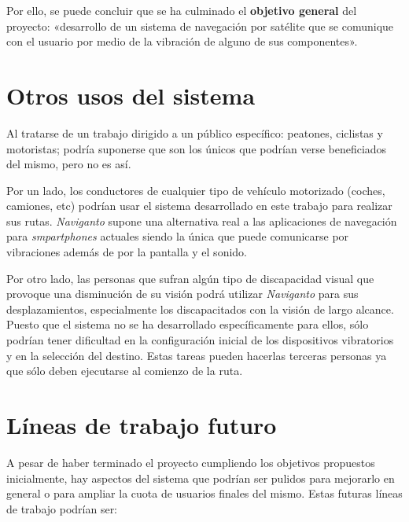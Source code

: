 Por ello, se puede concluir que se ha culminado el \textbf{objetivo general} del proyecto:
«desarrollo de un sistema de navegación por satélite que se comunique con el usuario por medio de la
  vibración de alguno de sus componentes».

\section{Otros usos del sistema}

Al tratarse de un trabajo dirigido a un público específico: peatones, ciclistas y motoristas; podría
suponerse que son los únicos que podrían verse beneficiados del mismo, pero no es así.

Por un lado, los conductores de cualquier tipo de vehículo motorizado (coches, camiones, etc)
podrían usar el sistema desarrollado en este trabajo para realizar sus rutas. \emph{Naviganto}
supone una alternativa real a las aplicaciones de navegación para \emph{smpartphones} actuales
siendo la única que puede comunicarse por vibraciones además de por la pantalla y el sonido.

Por otro lado, las personas que sufran algún tipo de discapacidad visual que provoque una
disminución de su visión podrá utilizar \emph{Naviganto} para sus desplazamientos, especialmente los
discapacitados con la visión de largo alcance. Puesto que el sistema no se ha desarrollado
específicamente para ellos, sólo podrían tener dificultad en la configuración inicial de los
dispositivos vibratorios y en la selección del destino. Estas tareas pueden hacerlas terceras
personas ya que sólo deben ejecutarse al comienzo de la ruta.

\section{Líneas de trabajo futuro}

A pesar de haber terminado el proyecto cumpliendo los objetivos propuestos inicialmente, hay
aspectos del sistema que podrían ser pulidos para mejorarlo en general o para ampliar la cuota de
usuarios finales del mismo. Estas futuras líneas de trabajo podrían ser:

